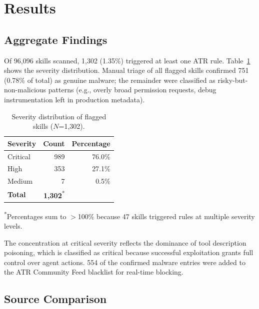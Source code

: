 \documentclass[letterpaper,twocolumn,10pt]{article}
\begin{document}
\section{Results}
\label{sec:results}

\subsection{Aggregate Findings}

Of 96,096 skills scanned, 1,302 (1.35\%) triggered at least one ATR rule.
Table~\ref{tab:severity} shows the severity distribution.  Manual triage
of all flagged skills confirmed 751 (0.78\% of total) as genuine
malware; the remainder were classified as risky-but-non-malicious
patterns (e.g., overly broad permission requests, debug instrumentation
left in production metadata).

\begin{table}[t]
\centering
\caption{Severity distribution of flagged skills ($N$=1,302).}
\label{tab:severity}
\small
\begin{tabular}{@{}lrr@{}}
\toprule
\textbf{Severity} & \textbf{Count} & \textbf{Percentage} \\
\midrule
Critical & 989 & 76.0\% \\
High     & 353 & 27.1\% \\
Medium   &   7 &  0.5\% \\
\midrule
\textbf{Total} & \textbf{1,302}\textsuperscript{*} & \\
\bottomrule
\end{tabular}
\begin{flushleft}
\textsuperscript{*}Percentages sum to $>$100\% because 47 skills triggered rules at multiple severity levels.
\end{flushleft}
\end{table}

The concentration at critical severity reflects the dominance of tool
description poisoning, which is classified as critical because successful
exploitation grants full control over agent actions.  554 of the
confirmed malware entries were added to the ATR Community Feed blacklist
for real-time blocking.

\subsection{Source Comparison}
\end{document}
